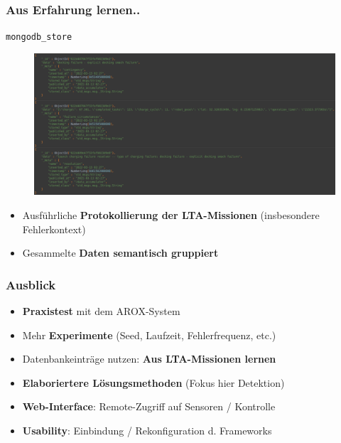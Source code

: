 \documentclass{beamer}
\newcommand{\code}[1]{\colorbox{light-gray}{\texttt{#1}}}
\begin{document}
\begin{frame}
  \frametitle{Aus Erfahrung lernen..}
  \code{mongodb\_store}
  \begin{figure}[H]
    \centering
    \includegraphics[width=\textwidth]{img/database_entries.png}
  \end{figure}
  \begin{itemize}
    \item Ausführliche \textbf{Protokollierung der LTA-Missionen} (insbesondere Fehlerkontext)
    \item Gesammelte \textbf{Daten semantisch gruppiert}
  \end{itemize}
\end{frame}

\begin{frame}
  \frametitle{Ausblick}
  \begin{itemize}
    \item \textbf{Praxistest} mit dem AROX-System
    \item Mehr \textbf{Experimente} (Seed, Laufzeit, Fehlerfrequenz, etc.)
    \item Datenbankeinträge nutzen: \textbf{Aus LTA-Missionen lernen}
    \item \textbf{Elaboriertere Lösungsmethoden} (Fokus hier Detektion)
    \item \textbf{Web-Interface}: Remote-Zugriff auf Sensoren / Kontrolle
    \item \textbf{Usability}: Einbindung / Rekonfiguration d. Frameworks
  \end{itemize}
\end{frame}

\begin{frame}[allowframebreaks]
  
  
\end{frame}
\end{document}
